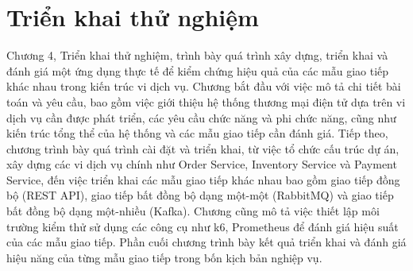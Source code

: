 \chapter{Triển khai thử nghiệm}

Chương 4, Triển khai thử nghiệm, trình bày quá trình xây dựng, triển khai và đánh giá một ứng dụng thực tế để kiểm chứng hiệu quả của các mẫu giao tiếp khác nhau trong kiến trúc vi dịch vụ. Chương bắt đầu với việc mô tả chi tiết bài toán và yêu cầu, bao gồm việc giới thiệu hệ thống thương mại điện tử dựa trên vi dịch vụ cần được phát triển, các yêu cầu chức năng và phi chức năng, cũng như kiến trúc tổng thể của hệ thống và các mẫu giao tiếp cần đánh giá. Tiếp theo, chương trình bày quá trình cài đặt và triển khai, từ việc tổ chức cấu trúc dự án, xây dựng các vi dịch vụ chính như Order Service, Inventory Service và Payment Service, đến việc triển khai các mẫu giao tiếp khác nhau bao gồm giao tiếp đồng bộ (REST API), giao tiếp bất đồng bộ dạng một-một (RabbitMQ) và giao tiếp bất đồng bộ dạng một-nhiều (Kafka). Chương cũng mô tả việc thiết lập môi trường kiểm thử sử dụng các công cụ như k6, Prometheus để đánh giá hiệu suất của các mẫu giao tiếp. Phần cuối chương trình bày kết quả triển khai và đánh giá hiệu năng của từng mẫu giao tiếp trong bốn kịch bản nghiệp vụ.








